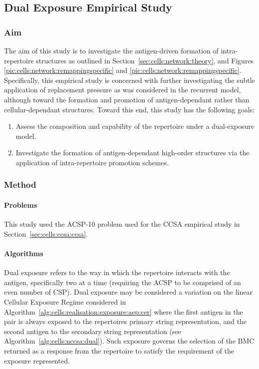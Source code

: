 %
%
\subsection{Dual Exposure Empirical Study}
\label{sec:cells:network:dualexposure:study}
%
%
\subsubsection{Aim}
The aim of this study is to investigate the antigen-driven formation of intra-repertoire structures as outlined in Section~\ref{sec:cells:network:theory}, and Figures \ref{pic:cells:network:remappingspecific} and \ref{pic:cells:network:remappingspecific}. Specifically, this empirical study is concerned with further investigating the subtle application of replacement pressure as was considered in the recurrent model, although toward the formation and promotion of antigen-dependant rather than cellular-dependant structures. Toward this end, this study has the following goals:

\begin{enumerate}
	\item Assess the composition and capability of the repertoire under a dual-exposure model.
	\item Investigate the formation of antigen-dependant high-order structures via the application of intra-repertoire promotion schemes.
\end{enumerate}


%
%
\subsubsection{Method}

%
%
\paragraph{Problems}
This study used the ACSP-10 problem used for the CCSA empirical study in Section~\ref{sec:cells:ccsa:ccsa}.

%
%
\paragraph{Algorithms}
Dual exposure refers to the way in which the repertoire interacts with the antigen, specifically two at a time (requiring the ACSP to be comprised of an even number of CSP). Dual exposure may be considered a variation on the linear Cellular Exposure Regime considered in Algorithm~\ref{alg:cells:realisation:exposure:aep:cer} where the first antigen in the pair is always exposed to the repertoires primary string representation, and the second antigen to the secondary string representation (see Algorithm~\ref{alg:cells:nccsa:dual}). Such exposure governs the selection of the BMC returned as a response from the repertoire to satisfy the requirement of the exposure represented. 

